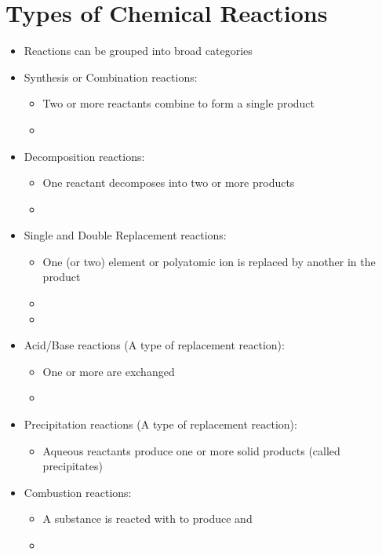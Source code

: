 \documentclass[12pt, openany, letterpaper]{memoir}
\begin{document}
\section{Types of Chemical Reactions}
\begin{itemize}
	\item Reactions can be grouped into broad categories
	\item Synthesis or Combination reactions:
	\begin{itemize}
		\item Two or more reactants combine to form a single product
		\item {}
	\end{itemize}
	\item Decomposition reactions:
	\begin{itemize}
		\item One reactant decomposes into two or more products
		\item {}
	\end{itemize}
	\item Single and Double Replacement reactions:
	\begin{itemize}
		\item One (or two) element or polyatomic ion is replaced by another in the product
		\item {}
		\item {}
	\end{itemize}
	\item Acid/Base reactions (A type of replacement reaction):
	\begin{itemize}
		\item  One or more  are exchanged
		\item {}
	\end{itemize}
	\item Precipitation reactions (A type of replacement reaction):
	\begin{itemize}
		\item Aqueous reactants produce one or more solid products (called precipitates)
	\end{itemize}
	\item Combustion reactions:
	\begin{itemize}
		\item A substance is reacted with  to produce  and 
		\item {}

\end{itemize}
\end{itemize}
\end{document}
